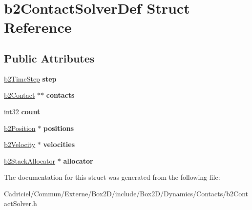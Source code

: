 \hypertarget{structb2_contact_solver_def}{}\section{b2\+Contact\+Solver\+Def Struct Reference}
\label{structb2_contact_solver_def}
\subsection*{Public Attributes}
\begin{DoxyCompactItemize}
\item 
\hyperlink{structb2_time_step}{b2\+Time\+Step} {\bfseries step}\hypertarget{structb2_contact_solver_def_a544604c01e6606ab54b8ccd5289a7ac7}{}\label{structb2_contact_solver_def_a544604c01e6606ab54b8ccd5289a7ac7}

\item 
\hyperlink{classb2_contact}{b2\+Contact} $\ast$$\ast$ {\bfseries contacts}\hypertarget{structb2_contact_solver_def_a4b9d708e3122cab8d9dabeafefc7a9af}{}\label{structb2_contact_solver_def_a4b9d708e3122cab8d9dabeafefc7a9af}

\item 
int32 {\bfseries count}\hypertarget{structb2_contact_solver_def_ae977ea1cee4b7b9ee99210d9b66f88ea}{}\label{structb2_contact_solver_def_ae977ea1cee4b7b9ee99210d9b66f88ea}

\item 
\hyperlink{structb2_position}{b2\+Position} $\ast$ {\bfseries positions}\hypertarget{structb2_contact_solver_def_aaf1432d040aa6279d91d8c9f24a4728a}{}\label{structb2_contact_solver_def_aaf1432d040aa6279d91d8c9f24a4728a}

\item 
\hyperlink{structb2_velocity}{b2\+Velocity} $\ast$ {\bfseries velocities}\hypertarget{structb2_contact_solver_def_ae839e5c5464aa54c1ad8ce1634b49a1f}{}\label{structb2_contact_solver_def_ae839e5c5464aa54c1ad8ce1634b49a1f}

\item 
\hyperlink{classb2_stack_allocator}{b2\+Stack\+Allocator} $\ast$ {\bfseries allocator}\hypertarget{structb2_contact_solver_def_a54198ac9886a988b9ffd06cf28c4c45c}{}\label{structb2_contact_solver_def_a54198ac9886a988b9ffd06cf28c4c45c}

\end{DoxyCompactItemize}


The documentation for this struct was generated from the following file\+:\begin{DoxyCompactItemize}
\item 
Cadriciel/\+Commun/\+Externe/\+Box2\+D/include/\+Box2\+D/\+Dynamics/\+Contacts/b2\+Contact\+Solver.\+h\end{DoxyCompactItemize}
